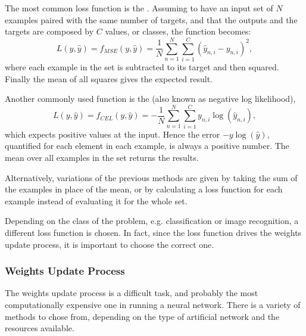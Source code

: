 The most common loss function is the .
Assuming to have an input set of $N$ examples paired with the same number of targets, and that the outputs and the targets are composed by $C$ values, or classes, the function becomes:
\begin{equation}
	L(y, \hat{y}) = f_{MSE}(y, \hat{y}) = \frac{1}{N} \sum_{n=1}^N \sum_{i=1}^C \left( \hat{y}_{n,i} - y_{n,i} \right)^2,
\end{equation}
where each example in the set is subtracted to its target and then squared.
Finally the mean of all squares gives the expected result.

Another commonly used function is the  (also known as negative log likelihood),
\begin{equation}
	L(y, \hat{y}) = f_{CEL}(y, \hat{y}) = - \frac{1}{N} \sum_{n=1}^N \sum_{i=1}^C y_{n,i} \log \left( \hat{y}_{n,i} \right),
\end{equation}
which expects positive values at the input.
Hence the error $-y\log \left( \hat{y} \right)$, quantified for each element in each example, is always a positive number.
The mean over all examples in the set returns the results.

Alternatively, variations of the previous methods are given by taking the sum of the examples in place of the mean, or by calculating a loss function for each example instead of evaluating it for the whole set.

Depending on the class of the problem, e.g. classification or image recognition, a different loss function is chosen.
In fact, since the loss function drives the weights update process, it is important to choose the correct one.

\subsubsection{Weights Update Process}
\label{sssec:Weights_Update_Process}

The weights update process is a difficult task, and probably the most computationally expensive one in running a neural network.
There is a variety of methods to chose from, depending on the type of artificial network and the resources available.


